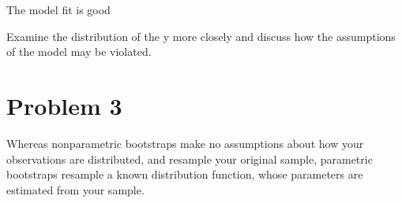 \documentclass[
]{article}
\begin{document}
The model fit is good

Examine the distribution of the y more closely and discuss how the
assumptions of the model may be violated.

\hypertarget{problem-3}{%
\section{Problem 3}\label{problem-3}}

Whereas nonparametric bootstraps make no assumptions about how your
observations are distributed, and resample your original sample,
parametric bootstraps resample a known distribution function, whose
parameters are estimated from your sample.
\end{document}

